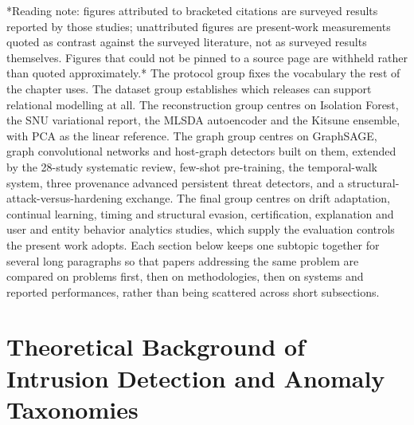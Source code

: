 *Reading note: figures attributed to bracketed citations are surveyed results reported by those studies; unattributed figures are present-work measurements quoted as contrast against the surveyed literature, not as surveyed results themselves. Figures that could not be pinned to a source page are withheld rather than quoted approximately.* The protocol group fixes the vocabulary the rest of the chapter uses. The dataset group establishes which releases can support relational modelling at all. The reconstruction group centres on Isolation Forest, the SNU variational report, the MLSDA autoencoder and the Kitsune ensemble, with PCA as the linear reference. The graph group centres on GraphSAGE, graph convolutional networks and host-graph detectors built on them, extended by the 28-study systematic review, few-shot pre-training, the temporal-walk system, three provenance advanced persistent threat detectors, and a structural-attack-versus-hardening exchange. The final group centres on drift adaptation, continual learning, timing and structural evasion, certification, explanation and user and entity behavior analytics studies, which supply the evaluation controls the present work adopts. Each section below keeps one subtopic together for several long paragraphs so that papers addressing the same problem are compared on problems first, then on methodologies, then on systems and reported performances, rather than being scattered across short subsections.

\section{Theoretical Background of Intrusion Detection and Anomaly Taxonomies}

